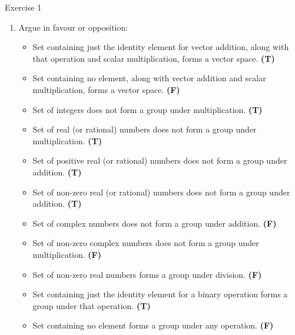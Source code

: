\documentclass{beamer}
\newcounter{savedenum}
\newcommand*{\saveenum}{\setcounter{savedenum}{\theenumi}}
\begin{document}
\begin{frame}{Exercise 1}
    \begin{enumerate}
        \item Argue in favour or opposition:
        \begin{itemize}
            \item Set containing just the identity element for vector addition, along with that operation and scalar multiplication, forms a vector space. \textbf{(T)}
            \item Set containing no element, along with vector addition and scalar multiplication, forms a vector space. \textbf{(F)}
            \item Set of integers does not form a group under multiplication. \textbf{(T)}
            \item Set of real (or rational) numbers does not form a group under multiplication. \textbf{(T)}
            \item Set of positive real (or rational) numbers does not form a group under addition. \textbf{(T)}
            \item Set of non-zero real (or rational) numbers does not form a group under addition. \textbf{(T)}
            \item Set of complex numbers does not form a group under addition. \textbf{(F)} 
            \item Set of non-zero complex numbers does not form a group under multiplication. \textbf{(F)}
            \item Set of non-zero real numbers forms a group under division. \textbf{(F)}
            \item Set containing just the identity element for a binary operation forms a group under that operation. \textbf{(T)}
            \item Set containing no element forms a group under any operation. \textbf{(F)}
        \end{itemize}
        \saveenum
    \end{enumerate}
\end{frame}
\end{document}
